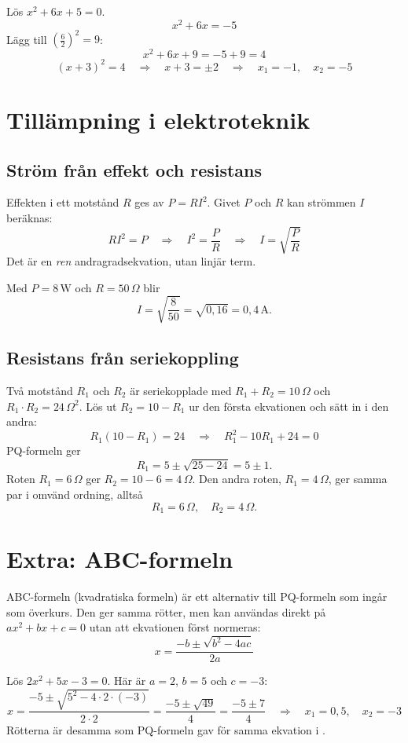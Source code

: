 \begin{exempel}
Lös $x^2 + 6x + 5 = 0$.
\[
  x^2 + 6x = -5
\]
Lägg till $\left(\frac{6}{2}\right)^2 = 9$:
\[
  x^2 + 6x + 9 = -5 + 9 = 4
\]
\[
  (x + 3)^2 = 4 \quad \Rightarrow \quad x + 3 = \pm 2
  \quad \Rightarrow \quad x_1 = -1, \quad x_2 = -5
\]
\end{exempel}

\section{Tillämpning i elektroteknik}
\label{c6:sec:tillampning}

\subsection{Ström från effekt och resistans}
\label{c6:sec:strom}
Effekten i ett motstånd $R$ ges av $P = RI^2$. Givet $P$ och $R$ kan strömmen $I$ beräknas:
\[
  RI^2 = P \quad \Rightarrow \quad I^2 = \frac{P}{R} \quad \Rightarrow \quad I = \sqrt{\frac{P}{R}}
\]
Det är en \emph{ren} andragradsekvation, utan linjär term.

\begin{exempel}
Med $P = 8\,\text{W}$ och $R = 50\,\Omega$ blir
\[
  I = \sqrt{\frac{8}{50}} = \sqrt{0{,}16} = 0{,}4\,\text{A}.
\]
\end{exempel}

\subsection{Resistans från seriekoppling}
\label{c6:sec:serie}
Två motstånd $R_1$ och $R_2$ är seriekopplade med $R_1 + R_2 = 10\,\Omega$ och
$R_1 \cdot R_2 = 24\,\Omega^2$. Lös ut $R_2 = 10 - R_1$ ur den första ekvationen och sätt in i
den andra:
\[
  R_1(10 - R_1) = 24 \quad \Rightarrow \quad R_1^2 - 10R_1 + 24 = 0
\]
PQ-formeln ger
\[
  R_1 = 5 \pm \sqrt{25 - 24} = 5 \pm 1.
\]
Roten $R_1 = 6\,\Omega$ ger $R_2 = 10 - 6 = 4\,\Omega$. Den andra roten, $R_1 = 4\,\Omega$, ger
samma par i omvänd ordning, alltså
\[
  R_1 = 6\,\Omega, \quad R_2 = 4\,\Omega.
\]

\section{Extra: ABC-formeln}
\label{c6:sec:abc}
ABC-formeln (kvadratiska formeln) är ett alternativ till PQ-formeln som ingår som överkurs. Den ger
samma rötter, men kan användas direkt på $ax^2 + bx + c = 0$ utan att ekvationen först normeras:
\[
  x = \frac{-b \pm \sqrt{b^2 - 4ac}}{2a}
\]

\begin{exempel}
Lös $2x^2 + 5x - 3 = 0$. Här är $a = 2$, $b = 5$ och $c = -3$:
\[
  x = \frac{-5 \pm \sqrt{5^2 - 4 \cdot 2 \cdot (-3)}}{2 \cdot 2} = \frac{-5 \pm \sqrt{49}}{4}
  = \frac{-5 \pm 7}{4} \quad \Rightarrow \quad x_1 = 0{,}5, \quad x_2 = -3
\]
Rötterna är desamma som PQ-formeln gav för samma ekvation i .
\end{exempel}
